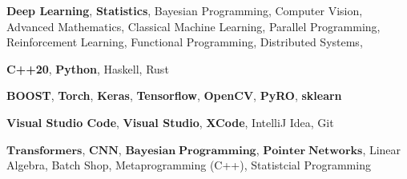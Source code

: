 %
%
%


	\begin{keywords}
		
			{
				\textbf{Deep Learning}, 
				\textbf{Statistics},
				Bayesian Programming,
				Computer Vision,
				Advanced Mathematics,
				Classical Machine Learning,
				Parallel Programming,
				Reinforcement Learning,
				Functional Programming,
				Distributed Systems,
			}
				
			{
				\textbf{C++20}, 
				\textbf{Python},
				 Haskell, 
				 Rust
			}
			
			{
				\textbf{BOOST},
				\textbf{Torch},
				\textbf{Keras},
				\textbf{Tensorflow}, 
				\textbf{OpenCV},
				\textbf{PyRO},
				\textbf{sklearn}
			}
		
			{
				\textbf{Visual Studio Code},
				\textbf{Visual Studio}, 
				\textbf{XCode},
				IntelliJ Idea, 
				Git
			}
		
		{
			$\mathbf{Transformers}$, $\mathbf{CNN}$, $\mathbf{Bayesian\;Programming}$, 
			$\mathbf{Pointer \;Networks}$, Linear Algebra, Batch Shop, Metaprogramming (C++), Statistcial Programming
		}		
				

	\end{keywords}